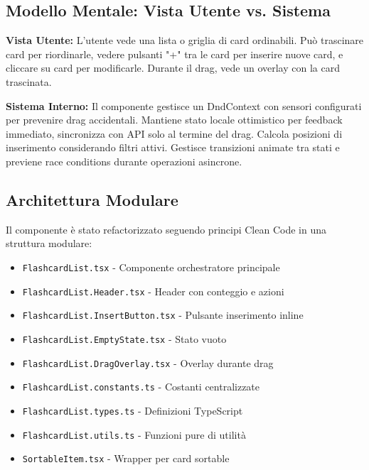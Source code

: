 \documentclass[11pt,a4paper]{article}
\begin{document}
\subsection{Modello Mentale: Vista Utente vs. Sistema}

\begin{tcolorbox}[colback=blue!5!white,colframe=blue!75!black,title=Modello Mentale]
\textbf{Vista Utente:}
L'utente vede una lista o griglia di card ordinabili. Può trascinare card per riordinarle, vedere pulsanti "+" tra le card per inserire nuove card, e cliccare su card per modificarle. Durante il drag, vede un overlay con la card trascinata.

\textbf{Sistema Interno:}
Il componente gestisce un DndContext con sensori configurati per prevenire drag accidentali. Mantiene stato locale ottimistico per feedback immediato, sincronizza con API solo al termine del drag. Calcola posizioni di inserimento considerando filtri attivi. Gestisce transizioni animate tra stati e previene race conditions durante operazioni asincrone.
\end{tcolorbox}

\subsection{Architettura Modulare}

Il componente è stato refactorizzato seguendo principi Clean Code in una struttura modulare:

\begin{itemize}
    \item \texttt{FlashcardList.tsx} - Componente orchestratore principale
    \item \texttt{FlashcardList.Header.tsx} - Header con conteggio e azioni
    \item \texttt{FlashcardList.InsertButton.tsx} - Pulsante inserimento inline
    \item \texttt{FlashcardList.EmptyState.tsx} - Stato vuoto
    \item \texttt{FlashcardList.DragOverlay.tsx} - Overlay durante drag
    \item \texttt{FlashcardList.constants.ts} - Costanti centralizzate
    \item \texttt{FlashcardList.types.ts} - Definizioni TypeScript
    \item \texttt{FlashcardList.utils.ts} - Funzioni pure di utilità
    \item \texttt{SortableItem.tsx} - Wrapper per card sortable
\end{itemize}
\end{document}
